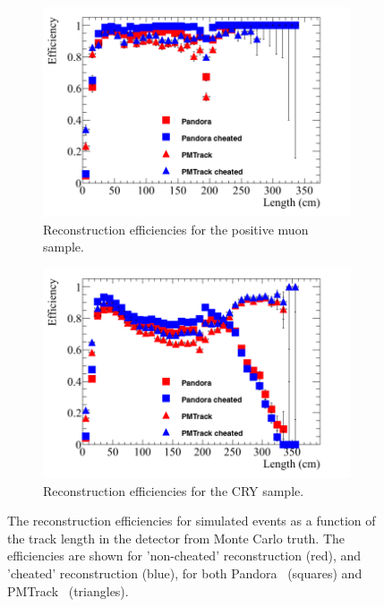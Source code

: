 \begin{figure}
  \centering
  \begin{subfigure}{0.48\textwidth}
    \centering
    \includegraphics[width=\textwidth]{Effic_AntiMuon_500V_All_Length}
    \caption{Reconstruction efficiencies for the positive muon sample.}
    \label{fig:SimEffic_Length_AMu}
  \end{subfigure}%
  \hspace{0.03\textwidth}%
  \begin{subfigure}{0.48\textwidth}
    \centering
    \includegraphics[width=\textwidth]{Effic_Cosmics_500V_All_Length}
    \caption{Reconstruction efficiencies for the CRY sample.}
    \label{fig:SimEffic_Length_CRY}
  \end{subfigure}
  \caption[The reconstruction efficiencies for simulated events as a function of the track length in the detector from Monte Carlo truth.]
          {The reconstruction efficiencies for simulated events as a function of the track length in the detector from Monte Carlo truth. The efficiencies are shown for 'non-cheated' reconstruction (red), and 'cheated' reconstruction (blue), for both Pandora~\citep{Pandora} (squares) and PMTrack~\citep{PMTrack} (triangles).}
          \label{fig:SimEffic_Length}
\end{figure}

